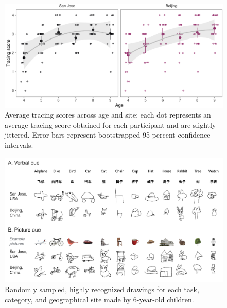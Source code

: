 \documentclass[
  english,
  man]{apa6}
\begin{document}
\begin{figure}[H]

{\centering \includegraphics[width=\textwidth]{figs/tracing-1} 

}

\caption{Average tracing scores across age and site; each dot represents an average tracing score obtained for each participant and are slightly jittered. Error bars represent bootstrapped 95 percent confidence intervals.}\label{fig:tracing}
\end{figure}

\begin{figure}[H]
\includegraphics[width=1\linewidth]{figs/example_drawings} \caption{Randomly sampled, highly recognized drawings for each task, category, and geographical site made by 6-year-old children.}\label{fig:example-drawings}
\end{figure}
\end{document}

